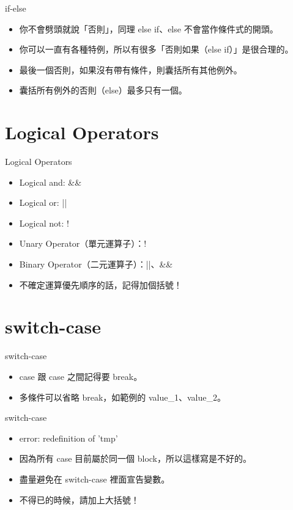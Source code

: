 \documentclass[t]{beamer}
\begin{document}
\begin{frame}{if-else}
  \begin{itemize}
    \item 你不會劈頭就說「否則」，同理 else if、else 不會當作條件式的開頭。
    \item 你可以一直有各種特例，所以有很多「否則如果（else if）」是很合理的。
    \item 最後一個否則，如果沒有帶有條件，則囊括所有其他例外。
    \item 囊括所有例外的否則（else）最多只有一個。
  \end{itemize}
\end{frame}

\section{Logical Operators}
\begin{frame}{Logical Operators}
  \begin{itemize}
    \item Logical and: \&\&
    \item Logical or: ||
    \item Logical not: !
    \item Unary Operator（單元運算子）：!
    \item Binary Operator（二元運算子）：||、\&\&
    \item 不確定運算優先順序的話，記得加個括號！
  \end{itemize}
\end{frame}

\section{switch-case}
\begin{frame}{switch-case}
  
  \begin{itemize}
    \item case 跟 case 之間記得要 break。
    \item 多條件可以省略 break，如範例的 value\_1、value\_2。
  \end{itemize}
\end{frame}

\begin{frame}{switch-case}
  
  \begin{itemize}
    \item error: redefinition of 'tmp'
    \item 因為所有 case 目前屬於同一個 block，所以這樣寫是不好的。
    \item 盡量避免在 switch-case 裡面宣告變數。
    \item 不得已的時候，請加上大括號！
  \end{itemize}
\end{frame}
\end{document}
